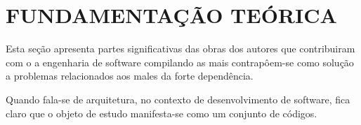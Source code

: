 


\section{\textbf{FUNDAMENTAÇÃO TEÓRICA}}
    \label{cha:fundamentacao-teorica}



    Esta seção apresenta partes significativas das obras dos autores que contribuiram
    com o a engenharia de software compilando as mais contrapôem-se como solução a
    problemas relacionados aos males da forte dependência.


    Quando fala-se de arquitetura, no contexto de desenvolvimento de software, fica claro que
    o objeto de estudo manifesta-se como um conjunto de códigos.


  




%
%
%     
%
%




    
\newpage
